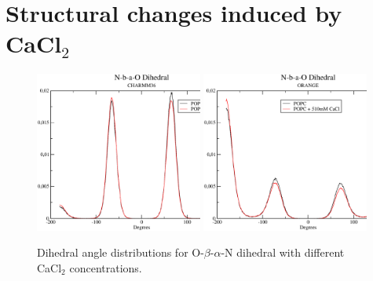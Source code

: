 \documentclass[pre,aps,floatfix,authordate1-4,twocolumn]{revtex4-1}
\begin{document}
\section{Structural changes induced by CaCl$_2$}

\begin{figure}[]
  \centering
  \includegraphics[width=0.49\textwidth]{../Fig/O-b-a-NdihWITHcaCHARMM36.eps} %
  \includegraphics[width=0.49\textwidth]{../Fig/O-b-a-NdihWITHcaORANGE.eps} %
  \caption{\label{ObaNdihs}
      Dihedral angle distributions for O-$\beta$-$\alpha$-N dihedral with different CaCl$_2$ concentrations.}
\end{figure}

\end{document}
